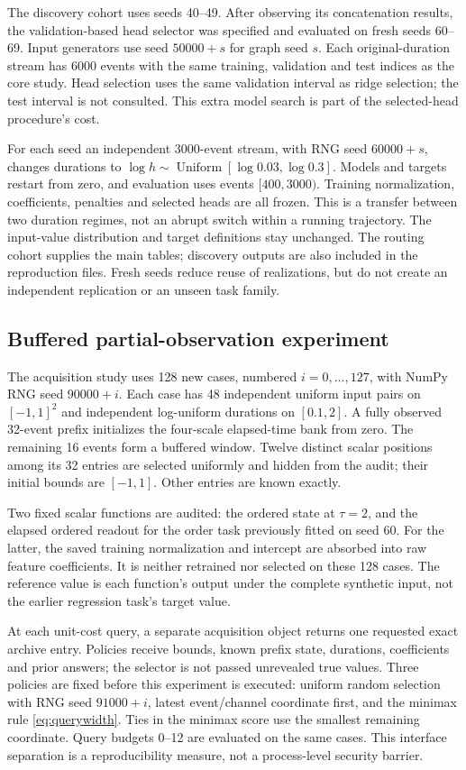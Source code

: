 \documentclass[11pt,a4paper]{article}
\theoremstyle{definition}\newtheorem{definition}[theorem]{Definition}
\begin{document}
The discovery cohort uses seeds 40--49. After observing its concatenation results, the validation-based head selector was specified and evaluated on fresh seeds 60--69. Input generators use seed $50000+s$ for graph seed $s$. Each original-duration stream has 6000 events with the same training, validation and test indices as the core study. Head selection uses the same validation interval as ridge selection; the test interval is not consulted. This extra model search is part of the selected-head procedure's cost.

For each seed an independent 3000-event stream, with RNG seed $60000+s$, changes durations to $\log h\sim\operatorname{Uniform}[\log0.03,\log0.3]$. Models and targets restart from zero, and evaluation uses events $[400,3000)$. Training normalization, coefficients, penalties and selected heads are all frozen. This is a transfer between two duration regimes, not an abrupt switch within a running trajectory. The input-value distribution and target definitions stay unchanged. The routing cohort supplies the main tables; discovery outputs are also included in the reproduction files. Fresh seeds reduce reuse of realizations, but do not create an independent replication or an unseen task family.

\subsection{Buffered partial-observation experiment}
The acquisition study uses 128 new cases, numbered $i=0,\ldots,127$, with NumPy RNG seed $90000+i$. Each case has 48 independent uniform input pairs on $[-1,1]^2$ and independent log-uniform durations on $[0.1,2]$. A fully observed 32-event prefix initializes the four-scale elapsed-time bank from zero. The remaining 16 events form a buffered window. Twelve distinct scalar positions among its 32 entries are selected uniformly and hidden from the audit; their initial bounds are $[-1,1]$. Other entries are known exactly.

Two fixed scalar functions are audited: the ordered state at $\tau=2$, and the elapsed ordered readout for the order task previously fitted on seed 60. For the latter, the saved training normalization and intercept are absorbed into raw feature coefficients. It is neither retrained nor selected on these 128 cases. The reference value is each function's output under the complete synthetic input, not the earlier regression task's target value.

At each unit-cost query, a separate acquisition object returns one requested exact archive entry. Policies receive bounds, known prefix state, durations, coefficients and prior answers; the selector is not passed unrevealed true values. Three policies are fixed before this experiment is executed: uniform random selection with RNG seed $91000+i$, latest event/channel coordinate first, and the minimax rule \eqref{eq:querywidth}. Ties in the minimax score use the smallest remaining coordinate. Query budgets 0--12 are evaluated on the same cases. This interface separation is a reproducibility measure, not a process-level security barrier.
\end{document}
